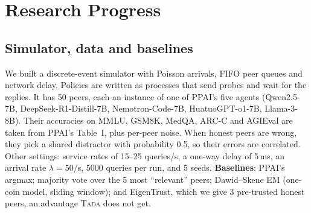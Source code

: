 \documentclass[conference]{IEEEtran}
\newcommand{\tada}{\textup{\textsc{Tada}}}
\begin{document}
\section{Research Progress}
\subsection{Simulator, data and baselines}
We built a discrete-event simulator with Poisson arrivals, FIFO peer queues and network delay.
Policies are written as processes that send probes and wait for the replies. It has 50 peers, each
an instance of one of PPAI's five agents (Qwen2.5-7B, DeepSeek-R1-Distill-7B, Nemotron-Code-7B,
HuatuoGPT-o1-7B, Llama-3-8B). Their accuracies on MMLU, GSM8K, MedQA, ARC-C and AGIEval are taken
from PPAI's Table~I, plus per-peer noise. When honest peers are wrong, they pick a shared distractor
with probability 0.5, so their errors are correlated. Other settings: service rates of 15--25
queries/s, a one-way delay of 5\,ms, an arrival rate $\lambda=50$/s, 5000 queries per run, and 5
seeds. \textbf{Baselines}: PPAI's argmax; majority vote over the 5 most ``relevant'' peers;
Dawid--Skene EM (one-coin model, sliding window); and EigenTrust, which we give 3 pre-trusted
honest peers, an advantage \tada{} does not get.
\end{document}

